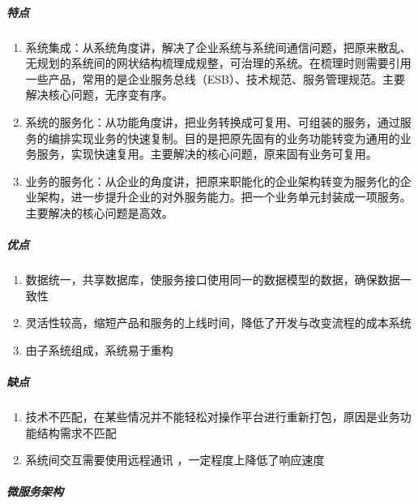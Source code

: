 \documentclass[letterpaper,11pt,english]{sphinxmanual}
\begin{document}
\subparagraph{特点}
\label{\detokenize{chapter_idea/understand_tech:id13}}\begin{enumerate}
%
\item {} 
系统集成：从系统角度讲，解决了企业系统与系统间通信问题，把原来散乱、无规划的系统间的网状结构梳理成规整，可治理的系统。在梳理时则需要引用一些产品，常用的是企业服务总线（ESB）、技术规范、服务管理规范。主要解决核心问题，无序变有序。

\item {} 
系统的服务化：从功能角度讲，把业务转换成可复用、可组装的服务，通过服务的编排实现业务的快速复制。目的是把原先固有的业务功能转变为通用的业务服务，实现快速复用。主要解决的核心问题，原来固有业务可复用。

\item {} 
业务的服务化：从企业的角度讲，把原来职能化的企业架构转变为服务化的企业架构，进一步提升企业的对外服务能力。把一个业务单元封装成一项服务。主要解决的核心问题是高效。

\end{enumerate}


\subparagraph{优点}
\label{\detokenize{chapter_idea/understand_tech:id14}}\begin{enumerate}
%
\item {} 
数据统一，共享数据库，使服务接口使用同一的数据模型的数据，确保数据一致性

\item {} 
灵活性较高，缩短产品和服务的上线时间，降低了开发与改变流程的成本系统

\item {} 
由子系统组成，系统易于重构

\end{enumerate}


\subparagraph{缺点}
\label{\detokenize{chapter_idea/understand_tech:id15}}\begin{enumerate}
%
\item {} 
技术不匹配，在某些情况并不能轻松对操作平台进行重新打包，原因是业务功能结构需求不匹配

\item {} 
系统间交互需要使用远程通讯 ，一定程度上降低了响应速度

\end{enumerate}


\subparagraph{微服务架构}
\label{\detokenize{chapter_idea/understand_tech:id17}}\label{\detokenize{chapter_idea/understand_tech:id16}}\label{\detokenize{chapter_idea/understand_tech:id18}}
\end{document}
